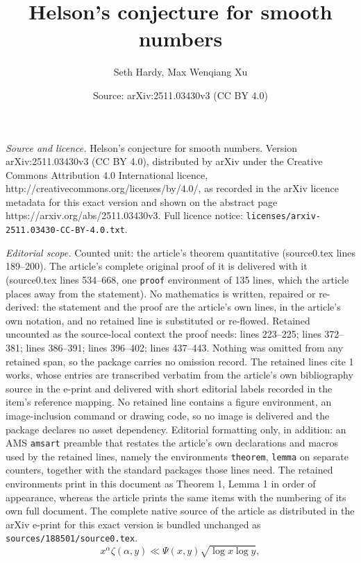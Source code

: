 \documentclass[10pt,a4paper]{amsart}
\title{Helson's conjecture for smooth numbers}
\author{Seth Hardy, Max Wenqiang Xu}
\date{Source: arXiv:2511.03430v3 (CC BY 4.0)}
\begin{document}
\maketitle

\noindent\emph{Source and licence.} Helson's conjecture for smooth numbers. Version arXiv:2511.03430v3 (CC BY 4.0), distributed by arXiv under the Creative Commons Attribution 4.0 International licence, http://creativecommons.org/licenses/by/4.0/, as recorded in the arXiv licence metadata for this exact version and shown on the abstract page https://arxiv.org/abs/2511.03430v3. Full licence notice: \texttt{licenses/arxiv-2511.03430-CC-BY-4.0.txt}.\par\smallskip

\noindent\textit{Editorial scope.} Counted unit: the article's theorem quantitative (source0.tex lines 189--200). The article's complete original proof of it is delivered with it (source0.tex lines 534--668, one \texttt{proof} environment of 135 lines, which the article places away from the statement). No mathematics is written, repaired or re-derived: the statement and the proof are the article's own lines, in the article's own notation, and no retained line is substituted or re-flowed.  Retained uncounted as the source-local context the proof needs: lines 223--225; lines 372--381; lines 386--391; lines 396--402; lines 437--443.  Nothing was omitted from any retained span, so the package carries no omission record.  The retained lines cite 1 works, whose entries are transcribed verbatim from the article's own bibliography source in the e-print and delivered with short editorial labels recorded in the item's reference mapping.  No retained line contains a figure environment, an image-inclusion command or drawing code, so no image is delivered and the package declares no asset dependency.  Editorial formatting only, in addition: an AMS \texttt{amsart} preamble that restates the article's own declarations and macros used by the retained lines, namely the environments \texttt{theorem}, \texttt{lemma} on separate counters, together with the standard packages those lines need.  The retained environments print in this document as Theorem 1, Lemma 1 in order of appearance, whereas the article prints the same items with the numbering of its own full document.  The complete native source of the article as distributed in the arXiv e-print for this exact version is bundled unchanged as \texttt{sources/188501/source0.tex}.
\begin{equation}\label{equ:rankin to true count comparison}
x^{\alpha} \zeta(\alpha,y) \ll \Psi(x,y) \sqrt{\log x \log y},
\end{equation}
\end{document}
